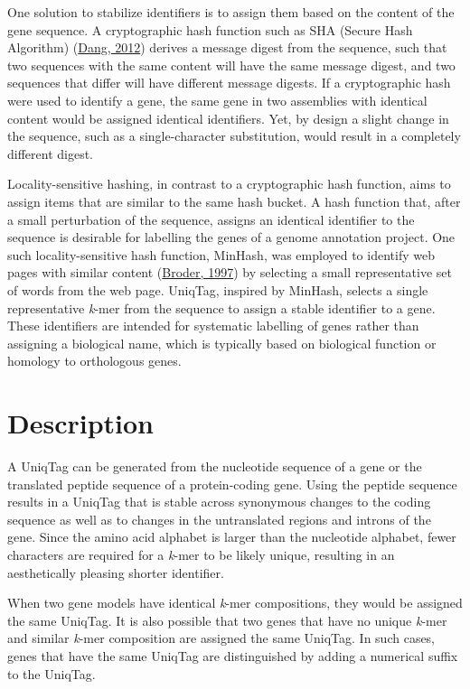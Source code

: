 \documentclass{bioinfo}
\begin{document}
One solution to stabilize identifiers is to assign them based on the
content of the gene sequence. A cryptographic hash function such as SHA
(Secure Hash Algorithm)
(\href{http://www.nist.gov/manuscript-publication-search.cfm?pub_id=910977}{Dang,
2012}) derives a message digest from the sequence, such that two
sequences with the same content will have the same message digest, and
two sequences that differ will have different message digests. If a
cryptographic hash were used to identify a gene, the same gene in two
assemblies with identical content would be assigned identical
identifiers. Yet, by design a slight change in the sequence, such as a
single-character substitution, would result in a completely different
digest.

Locality-sensitive hashing, in contrast to a cryptographic hash
function, aims to assign items that are similar to the same hash bucket.
A hash function that, after a small perturbation of the sequence,
assigns an identical identifier to the sequence is desirable for
labelling the genes of a genome annotation project. One such
locality-sensitive hash function, MinHash, was employed to identify web
pages with similar content
(\href{http://dx.doi.org/10.1109/SEQUEN.1997.666900}{Broder, 1997}) by
selecting a small representative set of words from the web page.
UniqTag, inspired by MinHash, selects a single representative
\emph{k}-mer from the sequence to assign a stable identifier to a gene.
These identifiers are intended for systematic labelling of genes rather
than assigning a biological name, which is typically based on biological
function or homology to orthologous genes.

\section{Description}\label{description}

A UniqTag can be generated from the nucleotide sequence of a gene or the
translated peptide sequence of a protein-coding gene. Using the peptide
sequence results in a UniqTag that is stable across synonymous changes
to the coding sequence as well as to changes in the untranslated regions
and introns of the gene. Since the amino acid alphabet is larger than
the nucleotide alphabet, fewer characters are required for a
\emph{k}-mer to be likely unique, resulting in an aesthetically pleasing
shorter identifier.

When two gene models have identical \emph{k}-mer compositions, they
would be assigned the same UniqTag. It is also possible that two genes
that have no unique \emph{k}-mer and similar \emph{k}-mer composition
are assigned the same UniqTag. In such cases, genes that have the same
UniqTag are distinguished by adding a numerical suffix to the UniqTag.
\end{document}
